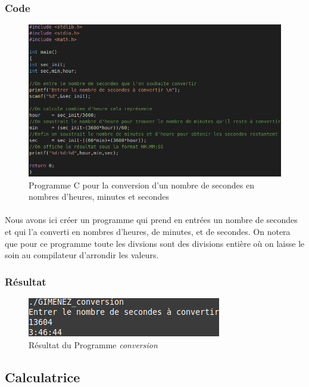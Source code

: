 \documentclass[10pt,a4paper]{article}
\begin{document}
\subsubsection{Code}
	\begin{figure}[h]
	\begin{center}
	\includegraphics[scale=.3]{images/conversion_c}
	\end{center}
	\caption{Programme C pour la conversion d'un nombre de secondes en nombres d'heures, minutes et secondes}
	\end{figure}
\paragraph{}
	Nous avons ici créer un programme qui prend en entrées un nombre de secondes et qui l'a converti 
	en nombres d'heures, de minutes, et de secondes. On notera que pour ce programme toute les 
	divsions sont des divisions entière où on laisse le soin au compilateur d'arrondir les valeurs.
\subsubsection{Résultat}
	\begin{figure}[h]
	\begin{center}
	\includegraphics[scale=.3]{images/conversion_ex}
	\end{center}
	\caption{Résultat du Programme \emph{conversion}}
	\end{figure}

\pagebreak
\subsection{Calculatrice}
\end{document}

